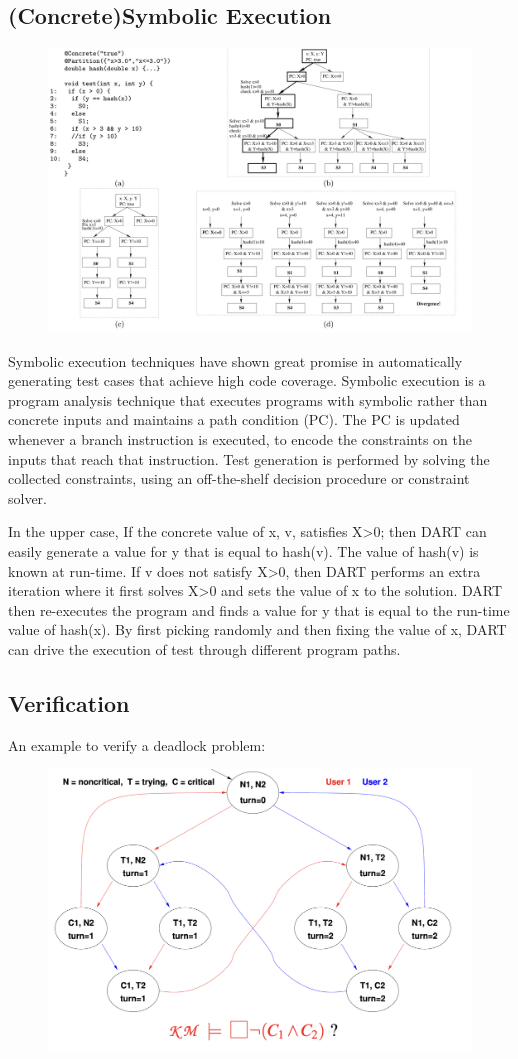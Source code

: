 \documentclass[a4paper]{exam}
\theoremstyle{definition}
\begin{document}
\subsection{(Concrete)Symbolic Execution\cite{puasuareanu2011symbolic}}
\begin{figure}
\centering
\includegraphics[width=12cm]{./img/conc_symbol.png}
\caption{}
\end{figure}

Symbolic execution techniques have
shown great promise in automatically generating test cases
that achieve high code coverage. Symbolic execution is a
program analysis technique that executes programs with
symbolic rather than concrete inputs and maintains a path
condition (PC). The PC is updated whenever a branch instruction is executed, to encode the constraints on the inputs
that reach that instruction. Test generation is performed by
solving the collected constraints, using an off-the-shelf decision procedure or constraint solver.

In the upper case, If the concrete value of x, v, satisfies X>0; then DART can
easily generate a value for y that is equal to hash(v). The
value of hash(v) is known at run-time. If v does not satisfy
X>0, then DART performs an extra iteration where it first
solves X>0 and sets the value of x to the solution. DART
then re-executes the program and finds a value for y that
is equal to the run-time value of hash(x). By first picking
randomly and then fixing the value of x, DART can drive
the execution of test through different program paths.
\subsection{Verification\cite{modelchecking}}
An example to verify a deadlock problem:
\begin{figure}
\centering
\includegraphics[width=12cm]{./img/mutual_exclusion.png}
\caption{}
\end{figure}
\printbibliography
\end{document}
